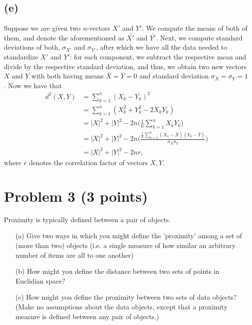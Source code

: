 \documentclass[10pt]{article}
\begin{document}
\subsection*{(e)}
Suppose we are given two $n$-vectors $X'$ and $Y'$. We compute the means of both of them, and denote the aforementioned as $\bar{X'}$ and $\bar{Y'}$. Next, we compute standard deviations of both, $\sigma_{X'}$ and $\sigma_{Y'}$, after which we have all the data needed to standardize $X'$ and $Y'$: for each component, we subtract the respective mean and divide by the respective standard deviation, and thus, we obtain two new vectors $X$ and $Y$ with both having means $\bar{X} = \bar{Y} = 0$ and standard deviation $\sigma_X = \sigma_Y = 1$.  Now we have that
\begin{align*}
d^2(X, Y) &= \sum_{k = 1}^n (X_k - Y_k)^2 \\
                 &= \sum_{k = 1}^n (X_k^2 + Y_k^2 - 2X_k Y_k) \\
                 &= |X|^2 + |Y|^2 - 2n \Bigg( \frac{1}{n} \sum_{k = 1}^n X_k Y_k \Bigg) \\
                 &= |X|^2 + |Y|^2 - 2n \Bigg( \frac{\frac{1}{n} \sum_{k = 1}^n (X_k - \bar{X})(Y_k - \bar{Y})}{\sigma_X \sigma_Y}\Bigg) \\
                 &= |X|^2 + |Y|^2 - 2nr,
\end{align*}
where $r$ denotes the correlation factor of vectors $X, Y$.
\color{red}
\section*{Problem 3 (3 points)}
Proximity is typically defined between a pair of objects.
\begin{itemize}
\item[(a)] Give two ways in which you might define the 'proximity' among a set of (more than two) objects (i.e. a single measure of how similar an arbitrary number of items are all to one another)
\item[(b)] How might you define the distance between two sets of points in Euclidian space?
\item[(c)] How might you define the proximity between two sets of data objects? (Make no assumptions about the data objects, except that a proximity measure is defined between any pair of objects.)
\end{itemize}

\color{black}
\end{document}
